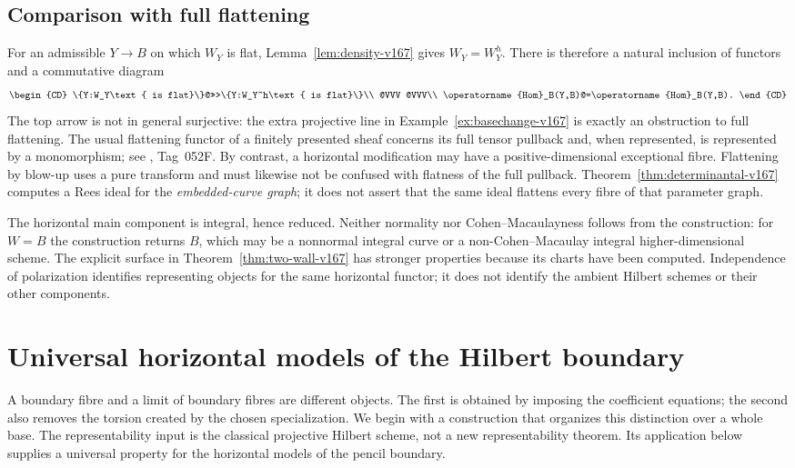 \documentclass[11pt,reqno]{amsart}
\numberwithin{equation}{section}
\theoremstyle{definition}\newtheorem{definition}[theorem]{Definition}
\theoremstyle{remark}\newtheorem{remark}[theorem]{Remark}
\begin{document}
\subsection{Comparison with full flattening}
For an admissible $Y\to B$ on which $W_Y$ is flat,
Lemma~\ref{lem:density-v167} gives $W_Y=W_Y^h$. There is therefore
a natural inclusion of functors and a commutative diagram
\[
\begin{CD}
 \{Y:W_Y\text{ is flat}\}@>>>\{Y:W_Y^h\text{ is flat}\}\\
 @VVV @VVV\\
 \operatorname{Hom}_B(Y,B)@=\operatorname{Hom}_B(Y,B).
\end{CD}
\]
The top arrow is not in general surjective: the extra projective
line in Example~\ref{ex:basechange-v167} is exactly an obstruction
to full flattening. The usual flattening functor of a finitely
presented sheaf concerns its full tensor pullback and, when
represented, is represented by a monomorphism; see
\cite{Stacks166}, Tag~052F. By contrast, a horizontal modification
may have a positive-dimensional exceptional fibre. Flattening by
blow-up uses a pure transform and must likewise not be confused
with flatness of the full pullback. Theorem~\ref{thm:determinantal-v167}
computes a Rees ideal for the \emph{embedded-curve graph}; it does
not assert that the same ideal flattens every fibre of that
parameter graph.

The horizontal main component is integral, hence reduced. Neither
normality nor Cohen--Macaulayness follows from the construction:
for $W=B$ the construction returns $B$, which may be a nonnormal
integral curve or a non-Cohen--Macaulay integral higher-dimensional
scheme. The explicit surface in Theorem~\ref{thm:two-wall-v167}
has stronger properties because its charts have been computed.
Independence of polarization identifies representing objects for
the same horizontal functor; it does not identify the ambient
Hilbert schemes or their other components.

\section{Universal horizontal models of the Hilbert boundary}
\label{sec:horizontal-v166}
A boundary fibre and a limit of boundary fibres are different objects.
The first is obtained by imposing the coefficient equations; the second
also removes the torsion created by the chosen specialization. We begin
with a construction that organizes this distinction over a whole base.
The representability input is the classical projective Hilbert scheme,
not a new representability theorem. Its application below supplies a
universal property for the horizontal models of the pencil boundary.
\end{document}
